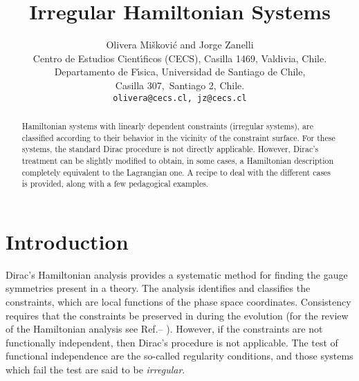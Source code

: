 \documentclass[a4paper,thmsa,11pt]{article}
\begin{document}
\title{Irregular Hamiltonian Systems}

\author{Olivera Mi\v {s}kovi\'{c}\coordHE{} and Jorge Zanelli\coordHE{}\\[2mm]
\coordHE{}Centro de Estudios Cient\'{\i }ficos (CECS), Casilla
1469, Valdivia, Chile.\\ \coordHE{}Departamento de F\'{\i }sica,
Universidad de Santiago de Chile,\\ Casilla 307,\ Santiago 2, Chile.
\\[2mm]
\texttt{olivera@cecs.cl, jz@cecs.cl}}
\date{}
\maketitle

\begin{abstract}
Hamiltonian systems with linearly dependent constraints (irregular
systems), are classified according to their behavior in the vicinity of the
constraint surface. For these systems, the standard Dirac procedure is not
directly applicable. However, Dirac's treatment can be slightly modified to
obtain, in some cases, a Hamiltonian description completely equivalent to
the Lagrangian one. A recipe to deal with the different cases is provided,
along with a few pedagogical examples.
\end{abstract}


\section{Introduction}

Dirac's Hamiltonian analysis provides a systematic method for finding the
gauge symmetries present in a theory. The analysis identifies and classifies
the constraints, which are local functions of the phase space coordinates.
Consistency requires that the constraints be preserved in during the
evolution (for the review of the Hamiltonian analysis see Ref.\cite{Dirac}--%
\cite{Chitaia-Gogilidze-Surovtsev}). However, if the constraints are not
functionally independent, then Dirac's procedure is not applicable. The test
of functional independence are the so-called regularity conditions, and
those systems which fail the test are said to be \emph{irregular}.
\end{document}
